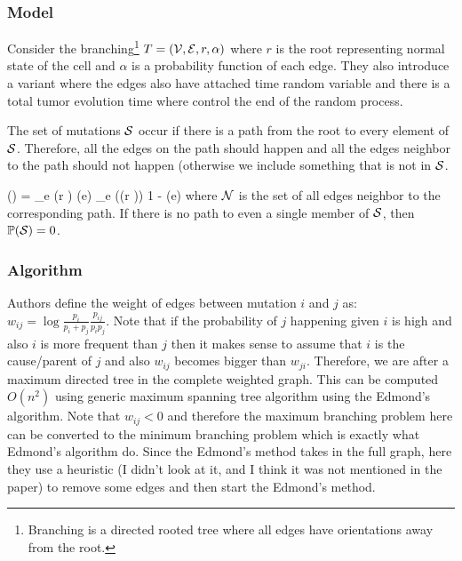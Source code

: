 	\subsubsection{Model}
	Consider the branching\footnote{Branching is a directed rooted tree where all edges have orientations away from the root.} $T = ({\cal V}, {\cal E}, r, \alpha)$ where $r$ is the root representing normal state of the cell and $\alpha$ is a probability function of each edge. 
	They also introduce a variant where the edges also have attached time random variable and there is a total tumor evolution time where control the end of the random process. 
	
	The set of mutations ${\cal S}$ occur if there is a path from the root to every element of ${\cal S}$. 
	Therefore, all the edges on the path should happen and all the edges neighbor to the path should not happen (otherwise we include something that is not in ${\cal S}$. 
	
	\be 
	\pr (\cS) = \prod_{e \in {}(r \rightarrow \cS)} \alpha(e) \prod_{e \in \cN((r \rightarrow \cS))} 1 - \alpha(e)
	\ee 
	where ${\cal N}$ is the set of all edges neighbor to the corresponding path. 	
	If there is no path to even a single member of ${\cal S}$, then $\mathbb{P}({\cal S}) = 0$.
	
	\subsubsection{Algorithm}
	Authors define the weight of edges between mutation $i$ and $j$ as: $w_{ij} = \log \frac{p_i}{p_i + p_j} \frac{p_{ij}}{p_i p_j}$.
	Note that if the probability of $j$ happening given $i$ is high and also $i$ is more frequent than $j$ then it makes sense to assume that $i$ is the cause/parent of $j$ and also $w_{ij}$ becomes bigger than $w_{ji}$.
	Therefore, we are after a maximum directed tree in the complete weighted graph. 
	This can be computed $O(n^2)$ using generic maximum spanning tree algorithm using the Edmond's algorithm. 
	Note that $w_{ij} < 0$ and therefore the maximum branching problem here can be converted to the minimum branching problem which is exactly what Edmond's algorithm do. 
	Since the Edmond's method takes in the full graph, here they use a heuristic (I didn't look at it, and I think it was not mentioned in the paper) to remove some edges and then start the Edmond's method. 
	

